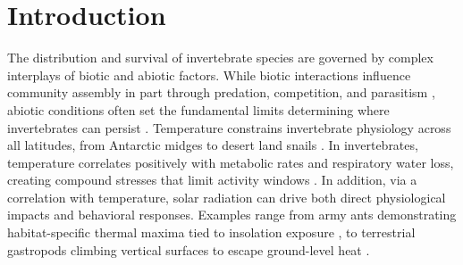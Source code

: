\documentclass[insects,article,submit,pdftex,moreauthors]{Definitions/mdpi}
\begin{document}
\section{Introduction}

The distribution and survival of invertebrate species are governed by complex interplays of biotic and abiotic factors. While biotic interactions influence community assembly in part through predation, competition, and parasitism \cite{blois-heulinDirectIndirectEffects1990,laffertyComparingMechanismsHost2013,miller-terkuilePredatorPreyInteractions2022}, abiotic conditions often set the fundamental limits determining where invertebrates can persist \cite{sextonEvolutionEcologySpecies2009,louthanWhereWhenSpecies2015,thomasClimateChangeRange2010}. Temperature constrains invertebrate physiology across all latitudes, from Antarctic midges \cite{everattResponsesInvertebratesTemperature2015} to desert land snails \cite{schweizerSnailsSunStrategies2019}. In invertebrates, temperature correlates positively with metabolic rates and respiratory water loss, creating compound stresses that limit activity windows \cite{chownWaterLossInsects2011}. In addition, via a correlation with temperature, solar radiation can drive both direct physiological impacts and behavioral responses. Examples range from army ants demonstrating habitat-specific thermal maxima tied to insolation exposure \cite{baudierExtremeInsolationClimatic2018}, to terrestrial gastropods climbing vertical surfaces to escape ground-level heat \cite{schweizerSnailsSunStrategies2019}.
\end{document}
